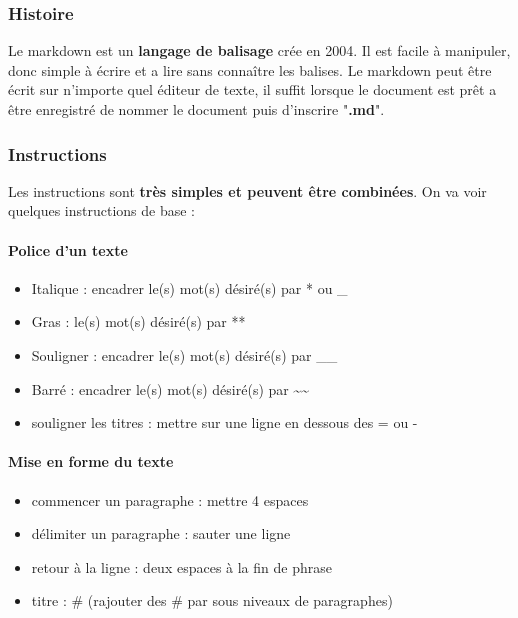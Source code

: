 \subsubsection{Histoire}

Le markdown est un \textbf{langage de balisage} crée en 2004. Il est facile à manipuler, donc simple à écrire et a lire sans connaître
 les balises.
Le markdown peut être écrit sur n'importe quel éditeur de texte, il suffit lorsque le document est prêt a être enregistré
 de nommer le document puis d'inscrire "\textbf{.md}".


\subsubsection{Instructions}

Les instructions sont \textbf{très simples et peuvent être combinées}.
On va voir quelques instructions de base :

\paragraph{Police d'un texte}
\begin{itemize}
	\item Italique : encadrer le(s) mot(s) désiré(s) par * ou \_
	\item Gras :  le(s) mot(s) désiré(s) par **
	\item Souligner : encadrer le(s) mot(s) désiré(s) par \_\_
	\item Barré : encadrer le(s) mot(s) désiré(s) par \~{}\~{}
	\item souligner les titres : mettre sur une ligne en dessous des = ou -
\end{itemize}


\paragraph{Mise en forme du texte}
\begin{itemize}
	\item commencer un paragraphe : mettre 4 espaces
	\item délimiter un paragraphe : sauter une ligne
	\item retour à la ligne : deux espaces à la fin de phrase
	\item titre : \# (rajouter des \# par sous niveaux de paragraphes)
\end{itemize}


